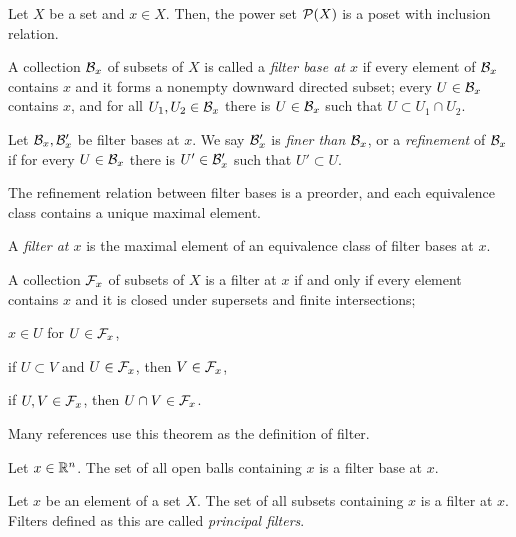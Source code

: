 \documentclass{../crs}
\begin{document}
\bigskip
Let $X$ be a set and $x\in X$.
Then, the power set $\mathcal{P}(X)$ is a poset with inclusion relation.
\begin{defn}
A collection $\mathcal{B}_x$ of subsets of $X$ is called a \emph{filter base at $x$} if every element of $\mathcal{B}_x$ contains $x$ and it forms a nonempty downward directed subset; every $U\in\mathcal{B}_x$ contains $x$, and for all $U_1,U_2\in\mathcal{B}_x$ there is $U\in\mathcal{B}_x$ such that $U\subset U_1\cap U_2$.
\end{defn}
\begin{defn}
Let $\mathcal{B}_x,\mathcal{B}'_x$ be filter bases at $x$.
We say $\mathcal{B}'_x$ is \emph{finer than} $\mathcal{B}_x$, or a \emph{refinement} of $\mathcal{B}_x$ if for every $U\in\mathcal{B}_x$ there is $U'\in\mathcal{B}'_x$ such that $U'\subset U$.
\end{defn}
\begin{prop}
The refinement relation between filter bases is a preorder, and each equivalence class contains a unique maximal element.
\end{prop}
\begin{pf}

\end{pf}
\begin{defn}
A \emph{filter at $x$} is the maximal element of an equivalence class of filter bases at $x$.
\end{defn}
\begin{thm}
A collection $\mathcal{F}_x$ of subsets of $X$ is a filter at $x$ if and only if every element contains $x$ and it is closed under supersets and finite intersections;
\begin{cond}
\item $x\in U$ for $U\in\mathcal{F}_x$,
\item if $U\subset V$ and $U\in\mathcal{F}_x$, then $V\in\mathcal{F}_x$,
\item if $U,V\in\mathcal{F}_x$, then $U\cap V\in\mathcal{F}_x$.
\end{cond}
\end{thm}
\begin{pf}

\end{pf}

Many references use this theorem as the definition of filter.

\begin{ex}
Let $x\in\mathbb{R}^n$.
The set of all open balls containing $x$ is a filter base at $x$.
\end{ex}
\begin{ex}
Let $x$ be an element of a set $X$.
The set of all subsets containing $x$ is a filter at $x$.
Filters defined as this are called \emph{principal filters}.
\end{ex}
\end{document}
